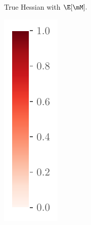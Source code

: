\begin{figure}[H]
\begin{subfigure}[t]{0.46\textwidth}
        \caption{True Hessian with $\E[\mM].$}
        \label{fig:Corr_UTAU_True_fc}
    \end{subfigure}%
    \begin{subfigure}[t]{0.065\textwidth}
        \centering
        \includegraphics[width=\textwidth]{Figures/Misc/colorbar.pdf}

\end{subfigure}
\end{figure}
